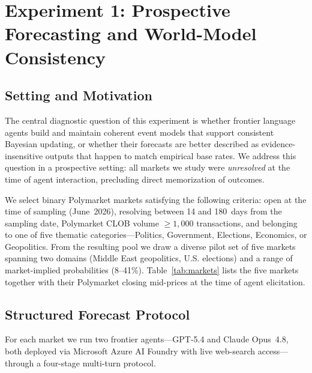 
\section{Experiment 1: Prospective Forecasting and World-Model Consistency}
\label{sec:exp1}

\subsection{Setting and Motivation}

The central diagnostic question of this experiment is whether frontier language agents build and maintain
coherent event models that support consistent Bayesian updating, or whether their forecasts are better
described as evidence-insensitive outputs that happen to match empirical base rates.  We address this
question in a prospective setting: all markets we study were \emph{unresolved} at the time of agent
interaction, precluding direct memorization of outcomes.

We select binary Polymarket markets satisfying the following criteria: open at the time of sampling
(June~2026), resolving between 14 and 180~days from the sampling date, Polymarket CLOB volume
$\geq 1{,}000$ transactions, and belonging to one of five thematic categories---Politics, Government,
Elections, Economics, or Geopolitics.  From the resulting pool we draw a diverse pilot set of five
markets spanning two domains (Middle East geopolitics, U.S. elections) and a range of market-implied
probabilities (8--41\%).  Table~\ref{tab:markets} lists the five markets together with their
Polymarket closing mid-prices at the time of agent elicitation.

\subsection{Structured Forecast Protocol}
\label{sec:protocol}

For each market we run two frontier agents---GPT-5.4 and Claude Opus~4.8, both deployed via Microsoft
Azure AI Foundry with live web-search access---through a four-stage multi-turn protocol.

